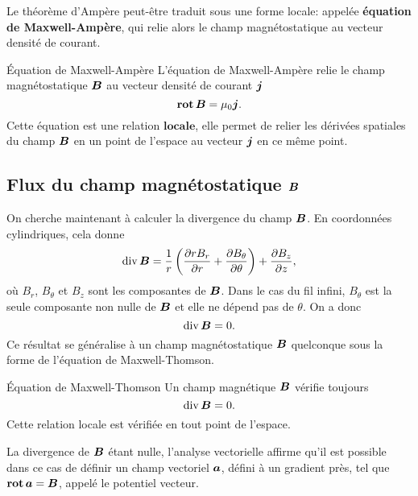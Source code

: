 Le théorème d'Ampère peut-être traduit sous une forme locale:
appelée \textbf{équation de Maxwell-Ampère}, qui relie alors le champ magnétostatique
au vecteur densité de courant.

\begin{defn}{Équation de Maxwell-Ampère}
	L'équation de Maxwell-Ampère relie le champ magnétostatique $\vecb$
	au vecteur densité de courant $\vecj$
	\begin{equation}
		\rot \vecb = \mu_0 \vecj.
		\label{eq:magneto_ma}
	\end{equation}
	Cette équation est une relation $\textbf{locale}$, elle permet de relier 
	les dérivées spatiales du champ $\vecb$ en un point de l'espace au vecteur
	$\vecj$ en ce même point.
\end{defn}

\subsection{Flux du champ magnétostatique $\vecb$}
On cherche maintenant à calculer la divergence du champ $\vecb$. En coordonnées 
cylindriques, cela donne
\begin{equation*}
	\div \vecb = \dfrac{1}{r}\left(\dd{r B_r}{r} + \dd{B_\theta}{\theta} \right)
	+ \dd{B_z}{z},
\end{equation*}
où $B_r$, $B_\theta$ et $B_z$ sont les composantes de $\vecb$. 
Dans le cas du fil infini, $B_\theta$ est la seule composante non nulle de $\vecb$ 
et elle ne dépend pas
de $\theta$. On a donc
\begin{equation*}
	\div \vecb = 0.
\end{equation*}
Ce résultat se généralise à un champ magnétostatique $\vecb$ quelconque sous
la forme de l'équation de Maxwell-Thomson.

\begin{defn}{Équation de Maxwell-Thomson}
	Un champ magnétique $\vecb$ vérifie toujours
	\begin{equation*}
		\div \vecb = 0.
	\end{equation*}
	Cette relation locale est vérifiée en tout point de l'espace.
\end{defn}

\begin{rema}
La divergence de $\vecb$ étant nulle, l'analyse vectorielle affirme
qu'il est possible dans ce cas de définir un champ vectoriel $\veca$,
défini à un gradient près, tel que $\rot \veca = \vecb$,
appelé le potentiel vecteur.
\end{rema}


